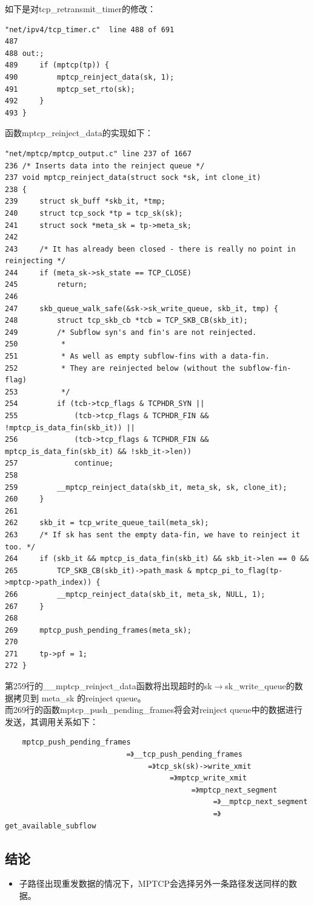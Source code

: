 如下是对tcp\_retransmit\_timer的修改：
\small\begin{verbatim}
"net/ipv4/tcp_timer.c"  line 488 of 691
487
488 out:;
489     if (mptcp(tp)) {
490         mptcp_reinject_data(sk, 1);
491         mptcp_set_rto(sk);
492     }
493 }
\end{verbatim}\normalsize
函数mptcp\_reinject\_data的实现如下：
\small\begin{verbatim}
"net/mptcp/mptcp_output.c" line 237 of 1667
236 /* Inserts data into the reinject queue */
237 void mptcp_reinject_data(struct sock *sk, int clone_it)
238 {
239     struct sk_buff *skb_it, *tmp;
240     struct tcp_sock *tp = tcp_sk(sk);
241     struct sock *meta_sk = tp->meta_sk;
242
243     /* It has already been closed - there is really no point in reinjecting */
244     if (meta_sk->sk_state == TCP_CLOSE)
245         return;
246
247     skb_queue_walk_safe(&sk->sk_write_queue, skb_it, tmp) {
248         struct tcp_skb_cb *tcb = TCP_SKB_CB(skb_it);
249         /* Subflow syn's and fin's are not reinjected.
250          *
251          * As well as empty subflow-fins with a data-fin.
252          * They are reinjected below (without the subflow-fin-flag)
253          */
254         if (tcb->tcp_flags & TCPHDR_SYN ||
255             (tcb->tcp_flags & TCPHDR_FIN && !mptcp_is_data_fin(skb_it)) ||
256             (tcb->tcp_flags & TCPHDR_FIN && mptcp_is_data_fin(skb_it) && !skb_it->len))
257             continue;
258
259         __mptcp_reinject_data(skb_it, meta_sk, sk, clone_it);
260     }
261
262     skb_it = tcp_write_queue_tail(meta_sk);
263     /* If sk has sent the empty data-fin, we have to reinject it too. */
264     if (skb_it && mptcp_is_data_fin(skb_it) && skb_it->len == 0 &&
265         TCP_SKB_CB(skb_it)->path_mask & mptcp_pi_to_flag(tp->mptcp->path_index)) {
266         __mptcp_reinject_data(skb_it, meta_sk, NULL, 1);
267     }
268
269     mptcp_push_pending_frames(meta_sk);
270
271     tp->pf = 1;
272 }
\end{verbatim}\normalsize
第259行的\_\_mptcp\_reinject\_data函数将出现超时的sk$\rightarrow$sk\_write\_queue的数据拷贝到 meta\_sk 的reinject queue。\\
而269行的函数mptcp\_push\_pending\_frames将会对reinject queue中的数据进行发送，其调用关系如下：
\small\begin{verbatim}
    mptcp_push_pending_frames
                            =》__tcp_push_pending_frames
                                 =》tcp_sk(sk)->write_xmit
                                      =》mptcp_write_xmit
                                           =》mptcp_next_segment
                                                =》__mptcp_next_segment
                                                =》get_available_subflow
\end{verbatim}\normalsize
\subsection{结论}
\begin{itemize}
  \item 子路径出现重发数据的情况下，MPTCP会选择另外一条路径发送同样的数据。
\end{itemize}